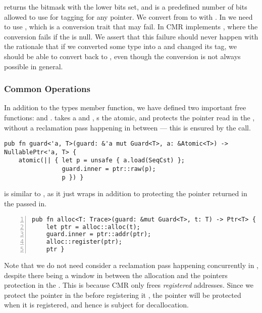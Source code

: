  returns the bitmask with the  lower bits set, and  is a
predefined number of bits allowed to use for tagging for any pointer. We convert from  to
 with  .  In  we need to use
, which is a conversion trait that may fail. In CMR  implements
, where the conversion fails if the  is null. We
assert that this failure should never happen  with the rationale that if we converted
some type  into a  and changed its tag, we should be able to convert back
to , even though the conversion is not always possible in general.





\subsubsection{Common Operations}

In addition to the types member function, we have defined two important free functions:
 and .
 takes a  and , s the atomic, and protects
the pointer read in the , without a reclamation pass happening in between --- this is
ensured by the  call.

\begin{lstlisting}
pub fn guard<'a, T>(guard: &'a mut Guard<T>, a: &Atomic<T>) -> NullablePtr<'a, T> {
    atomic(|| { let p = unsafe { a.load(SeqCst) };
                guard.inner = ptr::raw(p);
                p }) }
\end{lstlisting}
 is similar to , as it just wraps  in addition
to protecting the pointer returned in the  passed in.
\begin{lstlisting}[numbers=left, numberstyle=\color{gray}\ttfamily{}A]
pub fn alloc<T: Trace>(guard: &mut Guard<T>, t: T) -> Ptr<T> {
    let ptr = alloc::alloc(t);
    guard.inner = ptr::addr(ptr);
    alloc::register(ptr);
    ptr }
\end{lstlisting}

Note that we do not need consider a reclamation pass happening concurrently in ,
despite there being a window in between the allocation and the pointers protection in the
. This is because CMR only frees \emph{registered} addresses. Since we protect the
pointer in the   before registering it , the pointer will be
protected when it is registered, and hence is subject for decallocation.



